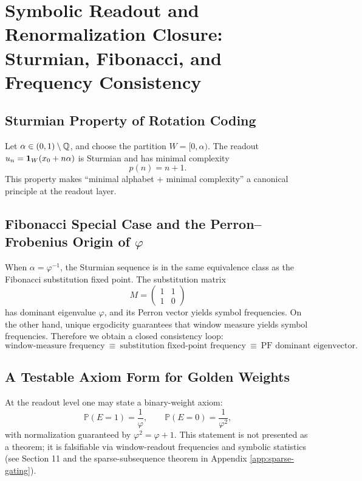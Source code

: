 ﻿\section{Symbolic Readout and Renormalization Closure: Sturmian, Fibonacci, and Frequency Consistency}

\subsection{Sturmian Property of Rotation Coding}

Let $\alpha\in(0,1)\setminus\mathbb{Q}$, and choose the partition $W=[0,\alpha)$. The readout $u_n=\mathbf{1}_W(x_0+n\alpha)$ is Sturmian and has minimal complexity
\[
p(n)=n+1.
\]
This property makes ``minimal alphabet + minimal complexity'' a canonical principle at the readout layer.

\subsection{Fibonacci Special Case and the Perron--Frobenius Origin of \texorpdfstring{$\varphi$}{varphi}}

When $\alpha=\varphi^{-1}$, the Sturmian sequence is in the same equivalence class as the Fibonacci substitution fixed point. The substitution matrix
\[
M=\begin{pmatrix}
1 & 1\\
1 & 0
\end{pmatrix}
\]
has dominant eigenvalue $\varphi$, and its Perron vector yields symbol frequencies.
On the other hand, unique ergodicity guarantees that window measure yields symbol frequencies.
Therefore we obtain a closed consistency loop:
\[
\text{window-measure frequency}\ \equiv\ \text{substitution fixed-point frequency}\ \equiv\ \text{PF dominant eigenvector}.
\]

\subsection{A Testable Axiom Form for Golden Weights}

At the readout level one may state a binary-weight axiom:
\[
\mathbb{P}(E=1)=\frac{1}{\varphi},\qquad \mathbb{P}(E=0)=\frac{1}{\varphi^2},
\]
with normalization guaranteed by $\varphi^2=\varphi+1$. This statement is not presented as a theorem; it is falsifiable via window-readout frequencies and symbolic statistics (see Section 11 and the sparse-subsequence theorem in Appendix \ref{app:sparse-gating}).
